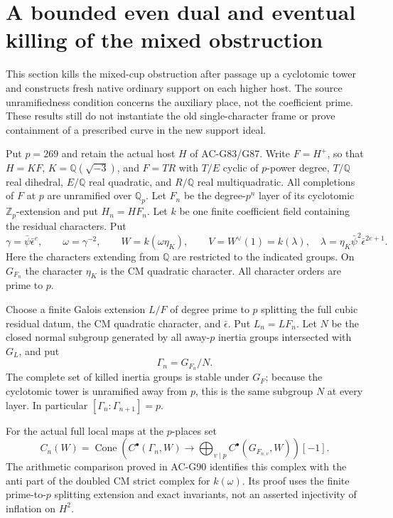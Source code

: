 \section{A bounded even dual and eventual killing of the mixed obstruction}
\label{sec:cubic-cyclotomic-mixed-obstruction}

This section kills the mixed-cup obstruction after passage up a
cyclotomic tower and constructs fresh native ordinary support on
each higher host.  The source unramifiedness condition concerns
the auxiliary place, not the coefficient prime.  These results
still do not instantiate the old single-character frame or prove
containment of a prescribed curve in the new support ideal.

Put $p=269$ and retain the actual host $H$ of AC-G83/G87.
Write $F=H^+$, so that $H=KF$, $K=\mathbb Q(\sqrt{-3})$, and
$F=TR$ with $T/E$ cyclic of $p$-power degree, $T/\mathbb Q$
real dihedral, $E/\mathbb Q$ real quadratic, and $R/\mathbb Q$
real multiquadratic.  All completions of $F$ at $p$ are unramified
over $\mathbb Q_p$.  Let $F_n$ be the degree-$p^n$ layer of its
cyclotomic $\mathbb Z_p$-extension and put $H_n=HF_n$.
Let $k$ be one finite coefficient field containing the residual
characters.  Put
\[
 \gamma=\bar\psi\bar\epsilon^e,\qquad
 \omega=\gamma^{-2},\qquad
 W=k(\omega\eta_K),\qquad
 V=W^\vee(1)=k(\lambda),\quad
 \lambda=\eta_K\bar\psi^2\bar\epsilon^{2e+1}.
 \tag{G91.1}
\]
Here the characters extending from $\mathbb Q$ are restricted to
the indicated groups.  On $G_{F_n}$ the character $\eta_K$ is
the CM quadratic character.  All character orders are prime to $p$.

Choose a finite Galois extension $L/F$ of degree prime to $p$
splitting the full cubic residual datum, the CM quadratic character,
and $\bar\epsilon$.  Put $L_n=LF_n$.
Let $N$ be the closed normal subgroup generated by all
away-$p$ inertia groups intersected with $G_L$, and put
\[
 \Gamma_n=G_{F_n}/N.
 \tag{G91.2}
\]
The complete set of killed inertia groups is stable under
$G_F$; because the cyclotomic tower is unramified away from $p$,
this is the same subgroup $N$ at every layer.  In particular
$[\Gamma_n:\Gamma_{n+1}]=p$.

For the actual full local maps at the $p$-places set
\[
 C_n(W)=\operatorname{Cone}\left(
 C^\bullet(\Gamma_n,W)\longrightarrow
 \bigoplus_{v\mid p}C^\bullet(G_{F_{n,v}},W)
 \right)[-1].
 \tag{G91.3}
\]
The arithmetic comparison proved in AC-G90 identifies this
complex with the anti part of the doubled CM strict complex
for $k(\omega)$.  Its proof uses the finite prime-to-$p$
splitting extension and exact invariants, not an asserted
injectivity of inflation on $H^2$.

